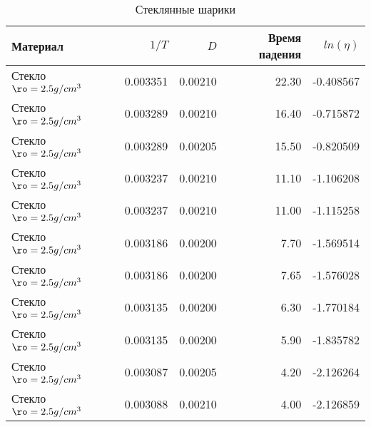 \begin{table}
\centering
\caption{Стеклянные шарики}
\begin{tabular}{lrrrr}
\toprule
                 Материал &    $1/T$ &     $D$ &  Время падения &  $ln(\eta)$ \\
\midrule
Стекло $\ro = 2.5 g/cm^3$ & 0.003351 & 0.00210 &          22.30 &   -0.408567 \\
Стекло $\ro = 2.5 g/cm^3$ & 0.003289 & 0.00210 &          16.40 &   -0.715872 \\
Стекло $\ro = 2.5 g/cm^3$ & 0.003289 & 0.00205 &          15.50 &   -0.820509 \\
Стекло $\ro = 2.5 g/cm^3$ & 0.003237 & 0.00210 &          11.10 &   -1.106208 \\
Стекло $\ro = 2.5 g/cm^3$ & 0.003237 & 0.00210 &          11.00 &   -1.115258 \\
Стекло $\ro = 2.5 g/cm^3$ & 0.003186 & 0.00200 &           7.70 &   -1.569514 \\
Стекло $\ro = 2.5 g/cm^3$ & 0.003186 & 0.00200 &           7.65 &   -1.576028 \\
Стекло $\ro = 2.5 g/cm^3$ & 0.003135 & 0.00200 &           6.30 &   -1.770184 \\
Стекло $\ro = 2.5 g/cm^3$ & 0.003135 & 0.00200 &           5.90 &   -1.835782 \\
Стекло $\ro = 2.5 g/cm^3$ & 0.003087 & 0.00205 &           4.20 &   -2.126264 \\
Стекло $\ro = 2.5 g/cm^3$ & 0.003088 & 0.00210 &           4.00 &   -2.126859 \\
\bottomrule
\end{tabular}
\end{table}

